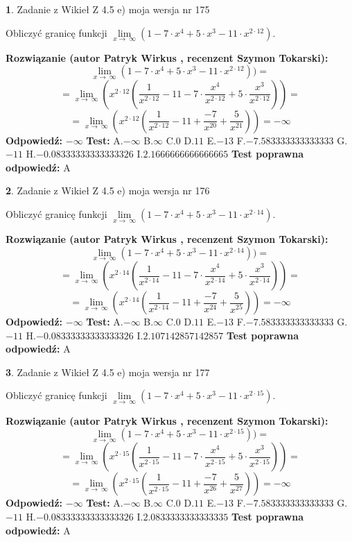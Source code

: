 \documentclass[12pt, a4paper]{article}
\theoremstyle{definition} %
\newtheorem{zad}{}
\newcommand{\zadStart}[1]{\begin{zad}#1\newline}
\newcommand{\zadStop}{\end{zad}}
\newcommand{\rozwStart}[2]{\noindent \textbf{Rozwiązanie (autor #1 , recenzent #2): }\newline}
\newcommand{\rozwStop}{\newline}
\newcommand{\odpStart}{\noindent \textbf{Odpowiedź:}\newline}
\newcommand{\odpStop}{\newline}
\newcommand{\testStart}{\noindent \textbf{Test:}\newline}
\newcommand{\testStop}{\newline}
\newcommand{\kluczStart}{\noindent \textbf{Test poprawna odpowiedź:}\newline}
\newcommand{\kluczStop}{\newline}
\begin{document}
\zadStart{Zadanie z Wikieł Z 4.5 e) moja wersja nr 175}


Obliczyć granicę funkcji  $\lim\limits_{x\to\ \infty}(1 - 7 \cdot x^{4}+5 \cdot x^{3}- 11 \cdot x^{2\cdot12})$.
\zadStop
\rozwStart{Patryk Wirkus}{Szymon Tokarski}
$$\lim\limits_{x\to\ \infty}(1 - 7 \cdot x^{4}+5 \cdot x^{3}- 11 \cdot x^{2\cdot12}))=$$
$$=\lim\limits_{x\to\ \infty}(x^{2\cdot12}(\frac{1}{x^{2\cdot12}}-11 -7 \cdot \frac{x^{4}}{x^{2\cdot12}}+5 \cdot \frac{x^{3}}{x^{2\cdot12}}))=$$
$$=\lim\limits_{x\to\ \infty}(x^{2\cdot12}(\frac{1}{x^{2\cdot12}}-11 + \frac{-7}{x^{20}}+ \frac{5}{x^{21}}))=-\infty$$
\rozwStop
\odpStart
$-\infty$
\odpStop
\testStart
A.$-\infty$ B.$\infty$ C.$0$ D.$11$ E.$-13$
F.$-7.583333333333333$ G.$-11$
H.$-0.08333333333333326$
I.$2.1666666666666665$
\testStop
\kluczStart
A
\kluczStop



\zadStart{Zadanie z Wikieł Z 4.5 e) moja wersja nr 176}


Obliczyć granicę funkcji  $\lim\limits_{x\to\ \infty}(1 - 7 \cdot x^{4}+5 \cdot x^{3}- 11 \cdot x^{2\cdot14})$.
\zadStop
\rozwStart{Patryk Wirkus}{Szymon Tokarski}
$$\lim\limits_{x\to\ \infty}(1 - 7 \cdot x^{4}+5 \cdot x^{3}- 11 \cdot x^{2\cdot14}))=$$
$$=\lim\limits_{x\to\ \infty}(x^{2\cdot14}(\frac{1}{x^{2\cdot14}}-11 -7 \cdot \frac{x^{4}}{x^{2\cdot14}}+5 \cdot \frac{x^{3}}{x^{2\cdot14}}))=$$
$$=\lim\limits_{x\to\ \infty}(x^{2\cdot14}(\frac{1}{x^{2\cdot14}}-11 + \frac{-7}{x^{24}}+ \frac{5}{x^{25}}))=-\infty$$
\rozwStop
\odpStart
$-\infty$
\odpStop
\testStart
A.$-\infty$ B.$\infty$ C.$0$ D.$11$ E.$-13$
F.$-7.583333333333333$ G.$-11$
H.$-0.08333333333333326$
I.$2.107142857142857$
\testStop
\kluczStart
A
\kluczStop



\zadStart{Zadanie z Wikieł Z 4.5 e) moja wersja nr 177}


Obliczyć granicę funkcji  $\lim\limits_{x\to\ \infty}(1 - 7 \cdot x^{4}+5 \cdot x^{3}- 11 \cdot x^{2\cdot15})$.
\zadStop
\rozwStart{Patryk Wirkus}{Szymon Tokarski}
$$\lim\limits_{x\to\ \infty}(1 - 7 \cdot x^{4}+5 \cdot x^{3}- 11 \cdot x^{2\cdot15}))=$$
$$=\lim\limits_{x\to\ \infty}(x^{2\cdot15}(\frac{1}{x^{2\cdot15}}-11 -7 \cdot \frac{x^{4}}{x^{2\cdot15}}+5 \cdot \frac{x^{3}}{x^{2\cdot15}}))=$$
$$=\lim\limits_{x\to\ \infty}(x^{2\cdot15}(\frac{1}{x^{2\cdot15}}-11 + \frac{-7}{x^{26}}+ \frac{5}{x^{27}}))=-\infty$$
\rozwStop
\odpStart
$-\infty$
\odpStop
\testStart
A.$-\infty$ B.$\infty$ C.$0$ D.$11$ E.$-13$
F.$-7.583333333333333$ G.$-11$
H.$-0.08333333333333326$
I.$2.0833333333333335$
\testStop
\kluczStart
A
\kluczStop
\end{document}

